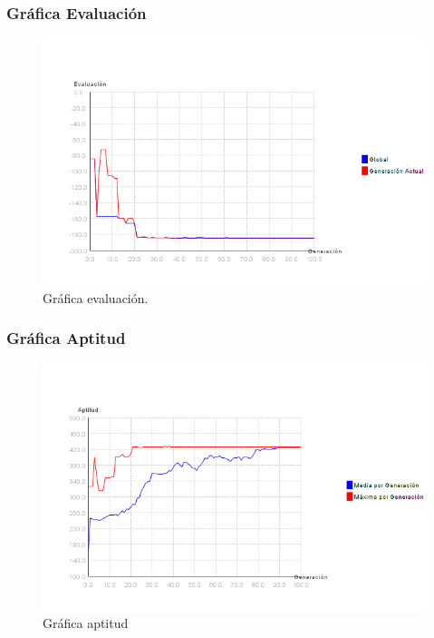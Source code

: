 \documentclass[12pt]{article}
\begin{document}
\subsubsection*{Gráfica Evaluación}
\begin{figure}[H]
\centering
\includegraphics[scale=0.5]{graficas/F4inicial_algoritmo}
\caption{Gráfica evaluación.}
\label{fig}
\end{figure}

\subsubsection*{Gráfica Aptitud}
\begin{figure}[H]
\centering
\includegraphics[scale=0.5]{graficas/F4inicial_aptitud}
\caption{Gráfica aptitud}
\label{fig}
\end{figure}
\end{document}
